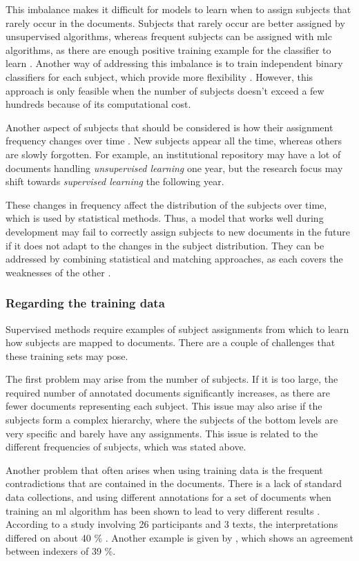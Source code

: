 This imbalance makes it difficult for models to learn when to assign subjects that rarely occur in the documents. Subjects that rarely occur are better assigned by unsupervised algorithms, whereas frequent subjects can be assigned with \acrlong{mlc} algorithms, as there are enough positive training example for the classifier to learn \cite{erbs2013bringing}. Another way of addressing this imbalance is to train independent binary classifiers for each subject, which provide more flexibility \cite{banerjee2019hierarchical}. However, this approach is only feasible when the number of subjects doesn't exceed a few hundreds because of its computational cost.

Another aspect of subjects that should be considered is how their assignment frequency changes over time \cite{toepfer2020fusion}. New subjects appear all the time, whereas others are slowly forgotten. For example, an institutional repository may have a lot of documents handling \textit{unsupervised learning} one year, but the research focus may shift towards \textit{supervised learning} the following year.

These changes in frequency affect the distribution of the subjects over time, which is used by statistical methods. Thus, a model that works well during development may fail to correctly assign subjects to new documents in the future if it does not adapt to the changes in the subject distribution. They can be addressed by combining statistical and matching approaches, as each covers the weaknesses of the other \cite{toepfer2020fusion}.

\subsubsection{Regarding the training data}

Supervised methods require examples of subject assignments from which to learn how subjects are mapped to documents. There are a couple of challenges that these training sets may pose.

The first problem may arise from the number of subjects. If it is too large, the required number of annotated documents significantly increases, as there are fewer documents representing each subject. This issue may also arise if the subjects form a complex hierarchy, where the subjects of the bottom levels are very specific and barely have any assignments. This issue is related to the different frequencies of subjects, which was stated above.

Another problem that often arises when using training data is the frequent contradictions that are contained in the documents. There is a lack of standard data collections, and using different annotations for a set of documents when training an \acrshort{ml} algorithm has been shown to lead to very different results \cite{yang1999evaluation}. According to a study involving 26 participants and 3 texts, the interpretations differed on about 40 \% \cite{morris2010individual}. Another example is given by \cite{medelyan2008domain}, which shows an agreement between indexers of 39 \%.
